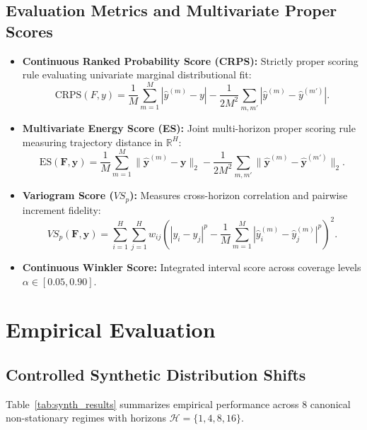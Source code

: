 \documentclass[10pt,journal,compsoc]{IEEEtran}
\begin{document}
\subsection{Evaluation Metrics and Multivariate Proper Scores}
\begin{itemize}
    \item \textbf{Continuous Ranked Probability Score (CRPS):} Strictly proper scoring rule evaluating univariate marginal distributional fit:
    \begin{equation}
    \text{CRPS}(F, y) = \frac{1}{M} \sum_{m=1}^M |\hat{y}^{(m)} - y| - \frac{1}{2M^2} \sum_{m, m'} |\hat{y}^{(m)} - \hat{y}^{(m')}|.
    \end{equation}
    \item \textbf{Multivariate Energy Score (ES):} Joint multi-horizon proper scoring rule measuring trajectory distance in $\mathbb{R}^H$:
    \begin{equation}
    \text{ES}(\mathbf{F}, \mathbf{y}) = \frac{1}{M} \sum_{m=1}^M \|\hat{\mathbf{y}}^{(m)} - \mathbf{y}\|_2 - \frac{1}{2M^2} \sum_{m, m'} \|\hat{\mathbf{y}}^{(m)} - \hat{\mathbf{y}}^{(m')}\|_2.
    \end{equation}
    \item \textbf{Variogram Score ($VS_p$):} Measures cross-horizon correlation and pairwise increment fidelity:
    \begin{equation}
    VS_p(\mathbf{F}, \mathbf{y}) = \sum_{i=1}^H \sum_{j=1}^H w_{ij} \left( |y_i - y_j|^p - \frac{1}{M}\sum_{m=1}^M |\hat{y}_i^{(m)} - \hat{y}_j^{(m)}|^p \right)^2.
    \end{equation}
    \item \textbf{Continuous Winkler Score:} Integrated interval score across coverage levels $\alpha \in [0.05, 0.90]$.
\end{itemize}

\section{Empirical Evaluation}

\subsection{Controlled Synthetic Distribution Shifts}
Table~\ref{tab:synth_results} summarizes empirical performance across 8 canonical non-stationary regimes with horizons $\mathcal{H} = \{1, 4, 8, 16\}$.
\end{document}
